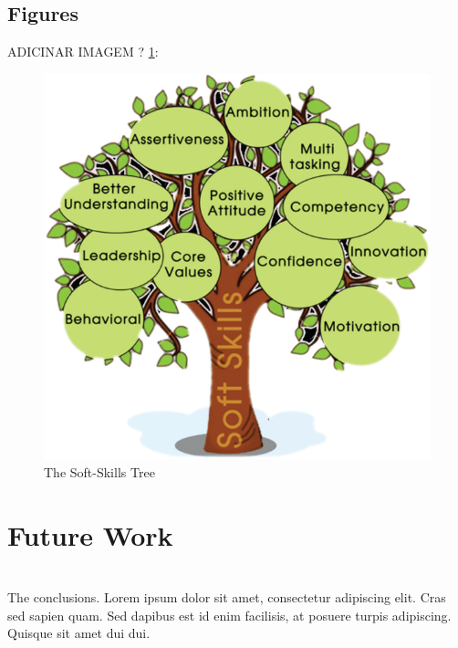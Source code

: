 \documentclass[a4paper,12pt,journal,twoside,compsoc]{PPIEEEtran}
\begin{document}
\subsection{Figures}
ADICINAR IMAGEM ? 
\ref{fig_sim}:

\begin{figure}[htb]
\centering
\includegraphics[width=1\linewidth]{soft_skills.png}
\caption{The Soft-Skills Tree}
\label{fig_sim}
\end{figure}


\section{Future Work}

\section{}
The conclusions. Lorem ipsum dolor sit amet, consectetur adipiscing elit. Cras sed sapien quam. Sed dapibus est id enim facilisis, at posuere turpis adipiscing. Quisque sit amet dui dui.
\end{document}
